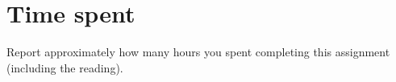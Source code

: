 \documentclass[letterpaper]{article}
\newcommand{\opt}{^\star}
\begin{document}


\section{Time spent}
Report approximately how many hours you spent completing this assignment (including the reading).
\end{document}
